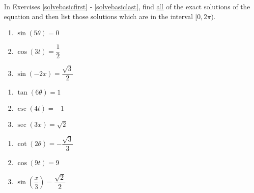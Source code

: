 \documentclass{ximera}
\begin{document}
	\author{Stitz-Zeager}


In Exercises \ref{solvebasicfirst} - \ref{solvebasiclast}, find \underline{all} of the exact solutions of the  equation and then list those solutions which are in the interval $[0, 2\pi)$.

\begin{multicols}{3}

\begin{enumerate}

\item $\sin \left( 5 \theta \right) = 0$  \label{solvebasicfirst}
\item $\cos \left( 3t \right) = \dfrac{1}{2}$ 
\item $\sin \left( -2x \right) = \dfrac{\sqrt{3}}{2}$ 

\setcounter{HW}{\value{enumi}}

\end{enumerate}

\end{multicols}

\begin{multicols}{3}

\begin{enumerate}

\setcounter{enumi}{\value{HW}}

\item $\tan \left( 6 \theta \right) = 1$
\item $\csc \left( 4 t \right) = -1$
\item $\sec \left( 3x \right) = \sqrt{2}$

\setcounter{HW}{\value{enumi}}

\end{enumerate}

\end{multicols}

\begin{multicols}{3}

\begin{enumerate}

\setcounter{enumi}{\value{HW}}

\item $\cot \left( 2 \theta \right) = -\dfrac{\sqrt{3}}{3}$
\item $\cos \left( 9t  \right) = 9$ 
\item $\sin \left( \dfrac{x}{3} \right) = \dfrac{\sqrt{2}}{2}$

\setcounter{HW}{\value{enumi}}

\end{enumerate}

\end{multicols}
\end{document}
